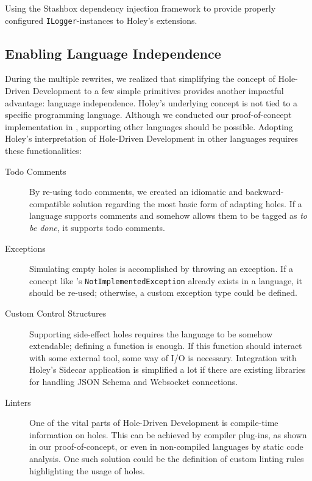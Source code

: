 \begin{program}[ht]
\caption{Using the Stashbox dependency injection framework to provide properly configured \texttt{ILogger}-instances to Holey's extensions.}
\label{prg:holey-supporting-logging}
\end{program}

\subsection{Enabling Language Independence}
\label{sec:holey-enabling-language-independence}
During the multiple rewrites, we realized that simplifying the concept of Hole-Driven Development to a few simple primitives provides another impactful advantage: language independence.
Holey's underlying concept is not tied to a specific programming language.
Although we conducted our proof-of-concept implementation in \CS, supporting other languages should be possible.
Adopting Holey's interpretation of Hole-Driven Development in other languages requires these functionalities:

\begin{description}
    \item[Todo Comments] By re-using todo comments, we created an idiomatic and backward-compatible solution regarding the most basic form of adapting holes. If a language supports comments and somehow allows them to be tagged as \emph{to be done}, it supports todo comments.
    \item[Exceptions] Simulating empty holes is accomplished by throwing an exception. If a concept like \CS's \verb|NotImplementedException| already exists in a language, it should be re-used; otherwise, a custom exception type could be defined.
    \item[Custom Control Structures] Supporting side-effect holes requires the language to be somehow extendable; defining a function is enough. If this function should interact with some external tool, some way of I/O is necessary. Integration with Holey's Sidecar application is simplified a lot if there are existing libraries for handling JSON Schema and Websocket connections.
    \item[Linters] One of the vital parts of Hole-Driven Development is compile-time information on holes. This can be achieved by compiler plug-ins, as shown in our proof-of-concept, or even in non-compiled languages by static code analysis. One such solution could be the definition of custom linting rules highlighting the usage of holes.
\end{description}

